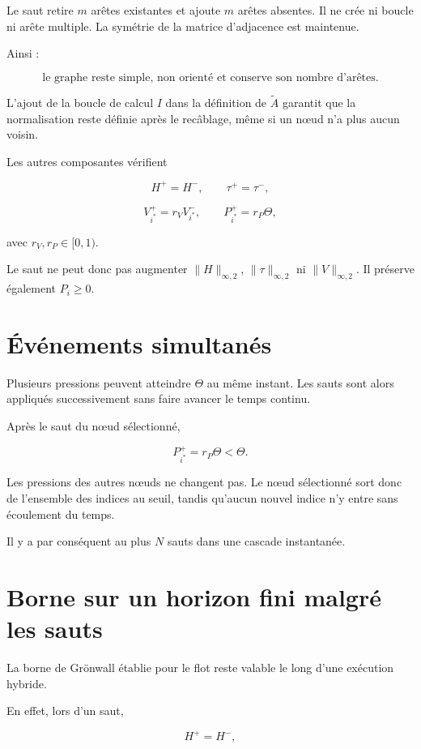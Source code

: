 Le saut retire \(m\) arêtes existantes et ajoute \(m\) arêtes
absentes. Il ne crée ni boucle ni arête multiple. La symétrie de la
matrice d'adjacence est maintenue.

Ainsi :

\[
\boxed{
\text{le graphe reste simple, non orienté et conserve son nombre
d'arêtes.}
}
\]

L'ajout de la boucle de calcul \(I\) dans la définition de
\(\widetilde A\) garantit que la normalisation reste définie après le
recâblage, même si un nœud n'a plus aucun voisin.

Les autres composantes vérifient

\[
H^+=H^-,
\qquad
\tau^+=\tau^-,
\]

\[
V_{i^\ast}^+
=
r_VV_{i^\ast}^-,
\qquad
P_{i^\ast}^+
=
r_P\Theta,
\]

avec \(r_V,r_P\in[0,1)\).

Le saut ne peut donc pas augmenter
\(\|H\|_{\infty,2}\), \(\|\tau\|_{\infty,2}\) ni
\(\|V\|_{\infty,2}\). Il préserve également \(P_i\geq0\).

\section{Événements simultanés}
\label{annexe-existence-evenements-simultanes}

Plusieurs pressions peuvent atteindre \(\Theta\) au même instant. Les
sauts sont alors appliqués successivement sans faire avancer le temps
continu.

Après le saut du nœud sélectionné,

\[
P_{i^\ast}^+
=
r_P\Theta
<
\Theta.
\]

Les pressions des autres nœuds ne changent pas. Le nœud sélectionné
sort donc de l'ensemble des indices au seuil, tandis qu'aucun nouvel
indice n'y entre sans écoulement du temps.

Il y a par conséquent au plus \(N\) sauts dans une cascade
instantanée.

\section{Borne sur un horizon fini malgré les sauts}
\label{annexe-existence-borne-horizon-fini}

La borne de Grönwall établie pour le flot reste valable le long d'une
exécution hybride.

En effet, lors d'un saut,

\[
H^+=H^-,
\]

